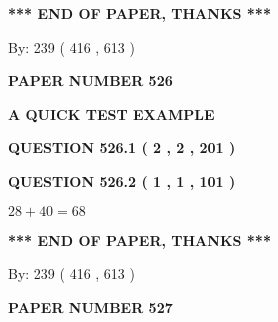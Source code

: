 \documentclass[12pt]{article}
\begin{document}
   
   
\vspace{1.0in} 
{\textbf{\large{ *** END OF PAPER, THANKS *** }}} 
   
   
\hspace{1.0in} By: 
 239 ( 416 ,  613 )
   
   
   
   
\newpage 
\setcounter{page}{ 
   526001 } 
   
   
   
   
 {\textbf{ \Large{ PAPER NUMBER  526  }}}
   
   
\vspace{0.2in}
   
   
   
   
   
   
 \vspace{0.2in}
{\LARGE {\textbf{ A QUICK TEST EXAMPLE}}}
   
   
  
\vspace{0.2in}
  
{\textbf{\Large{QUESTION
526.1 
 ( 2 , 2 , 201 )
}}}
  
  
  
\vspace{0.2in}
  
{\textbf{\Large{QUESTION
526.2 
 ( 1 , 1 , 101 )
}}}
  
  
 
 

$ %
28 +  %
40=   %
68$
 
 
   
   
 \vspace{0.2in}
 
   
   
   
   
\vspace{1.0in} 
{\textbf{\large{ *** END OF PAPER, THANKS *** }}} 
   
   
\hspace{1.0in} By: 
 239 ( 416 ,  613 )
   
   
   
   
\newpage 
\setcounter{page}{ 
   527001 } 
   
   
   
   
 {\textbf{ \Large{ PAPER NUMBER  527  }}}
   
   
\vspace{0.2in}
   
\end{document}
